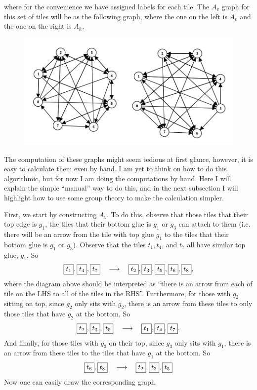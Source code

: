\documentclass[11pt,a4paper]{article}
\newcommand{\tile}[1]{\fbox{\ensuremath{#1}}}
\theoremstyle{definition}
\theoremstyle{remark}
\theoremstyle{definition}
\begin{document}
	where for the convenience we have assigned labels for each tile. The $ A_v $ graph for this set of tiles will be as the following graph, where the one on the left is $ A_v $ and the one on the right is $ A_h $.
	
	\begin{figure}[h!]
		\centering
		\includegraphics[width=0.5\linewidth]{images/A_vA_hwithRotation.png}
		\label{fig:graph}
	\end{figure}
	\FloatBarrier
	The computation of these graphs might seem tedious at first glance, however, it is easy to calculate them even by hand. I am yet to think on how to do this algorithmic, but for now I am doing the computations by hand. Here I will explain the simple ``manual'' way to do this, and in the next subsection I will highlight how to use some group theory to make the calculation simpler.
	
	First, we start by constructing $ A_v $. To do this, observe that those tiles that their top edge is $ g_1 $, the tiles that their bottom glue is $ g_1 $ or $ g_3 $ can attach to them (i.e. there will be an arrow from the tile with top glue $ g_1 $ to the tiles that their bottom glue is $ g_1 $ or $ g_3 $). Observe that the tiles $ t_1,t_4 $, and $ t_7 $ all have similar top glue, $ g_1 $. So 
	\[ \tile{t_1},\tile{t_4}, \tile{t_7} \quad\longrightarrow\quad \tile{t_2},\tile{t_3},\tile{t_5},\tile{t_6},\tile{t_8}, \]
	where the diagram above should be interpreted as ``there is an arrow from each of tile on the LHS to all of the tiles in the RHS''. Furthermore, for those with $ g_2 $ sitting on top, since $ g_2 $ only sits with $ g_2 $, there is an arrow from these tiles to only those tiles that have $ g_2 $ at the bottom. So
	\[ \tile{t_2},\tile{t_3},\tile{t_5} \quad\longrightarrow\quad \tile{t_1},\tile{t_4},\tile{t_7}. \]
	And finally, for those tiles with $ g_3 $ on their top, since $ g_3 $ only sits with $ g_1 $, there is an arrow from these tiles to the tiles that have $ g_1 $ at the bottom. So
	\[ \tile{t_6},\tile{t_8} \quad\longrightarrow\quad \tile{t_2},\tile{t_3},\tile{t_5} \]
	Now one can easily draw the corresponding graph.
	
\end{document}

